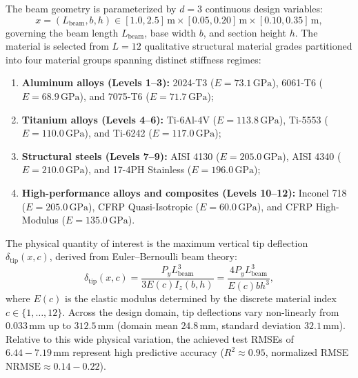 \documentclass[default,sn-mathphys,Numbered]{sn-jnl}
\theoremstyle{thmstyleone}
\theoremstyle{thmstylethree}
\theoremstyle{thmstyletwo}
\begin{document}
The beam geometry is parameterized by $d = 3$ continuous design variables:
\begin{equation}
x = (L_{\mathrm{beam}}, b, h) \in [1.0, 2.5]\,\mathrm{m} \times [0.05, 0.20]\,\mathrm{m} \times [0.10, 0.35]\,\mathrm{m},
\end{equation}
governing the beam length $L_{\mathrm{beam}}$, base width $b$, and section height $h$. The material is selected from $L = 12$ qualitative structural material grades partitioned into four material groups spanning distinct stiffness regimes:
\begin{enumerate}
    \item \textbf{Aluminum alloys (Levels 1--3):} 2024-T3 ($E = 73.1\,\mathrm{GPa}$), 6061-T6 ($E = 68.9\,\mathrm{GPa}$), and 7075-T6 ($E = 71.7\,\mathrm{GPa}$);
    \item \textbf{Titanium alloys (Levels 4--6):} Ti-6Al-4V ($E = 113.8\,\mathrm{GPa}$), Ti-5553 ($E = 110.0\,\mathrm{GPa}$), and Ti-6242 ($E = 117.0\,\mathrm{GPa}$);
    \item \textbf{Structural steels (Levels 7--9):} AISI 4130 ($E = 205.0\,\mathrm{GPa}$), AISI 4340 ($E = 210.0\,\mathrm{GPa}$), and 17-4PH Stainless ($E = 196.0\,\mathrm{GPa}$);
    \item \textbf{High-performance alloys and composites (Levels 10--12):} Inconel 718 ($E = 205.0\,\mathrm{GPa}$), CFRP Quasi-Isotropic ($E = 60.0\,\mathrm{GPa}$), and CFRP High-Modulus ($E = 135.0\,\mathrm{GPa}$).
\end{enumerate}
The physical quantity of interest is the maximum vertical tip deflection $\delta_{\mathrm{tip}}(x, c)$, derived from Euler--Bernoulli beam theory:
\begin{equation}
\label{eq:cantilever_deflection}
\delta_{\mathrm{tip}}(x, c) = \frac{P_y L_{\mathrm{beam}}^3}{3 E(c) I_z(b, h)} = \frac{4 P_y L_{\mathrm{beam}}^3}{E(c) b h^3},
\end{equation}
where $E(c)$ is the elastic modulus determined by the discrete material index $c \in \{1, \dots, 12\}$. Across the design domain, tip deflections vary non-linearly from $0.033\,\mathrm{mm}$ up to $312.5\,\mathrm{mm}$ (domain mean $24.8\,\mathrm{mm}$, standard deviation $32.1\,\mathrm{mm}$). Relative to this wide physical variation, the achieved test RMSEs of $6.44 - 7.19\,\mathrm{mm}$ represent high predictive accuracy ($R^2 \approx 0.95$, normalized RMSE $\mathrm{NRMSE} \approx 0.14 - 0.22$).
\end{document}
